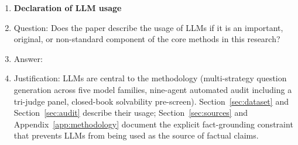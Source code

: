 \begin{enumerate}
\item {\bf Declaration of LLM usage}
    \item[] Question: Does the paper describe the usage of LLMs if it is an important, original, or non-standard component of the core methods in this research?
    \item[] Answer: \answerYes{}
    \item[] Justification: LLMs are central to the methodology (multi-strategy question generation across five model families, nine-agent automated audit including a tri-judge panel, closed-book solvability pre-screen). Section~\ref{sec:dataset} and Section~\ref{sec:audit} describe their usage; Section~\ref{sec:sources} and Appendix~\ref{app:methodology} document the explicit fact-grounding constraint that prevents LLMs from being used as the source of factual claims.

\end{enumerate}
